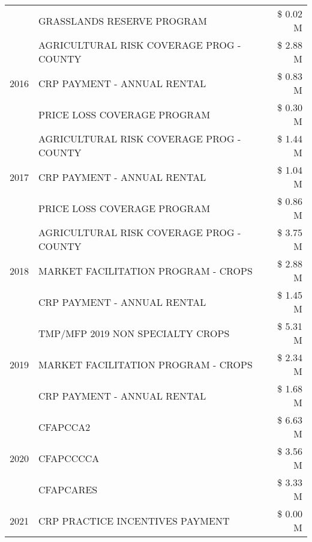 \begin{tabular}{llr}
 & GRASSLANDS RESERVE PROGRAM & \$ 0.02 M \\
\cline{1-3}
\multirow[t]{3}{*}{2016} & AGRICULTURAL RISK COVERAGE PROG - COUNTY & \$ 2.88 M \\
 & CRP PAYMENT - ANNUAL RENTAL & \$ 0.83 M \\
 & PRICE LOSS COVERAGE PROGRAM & \$ 0.30 M \\
\cline{1-3}
\multirow[t]{3}{*}{2017} & AGRICULTURAL RISK COVERAGE PROG - COUNTY & \$ 1.44 M \\
 & CRP PAYMENT - ANNUAL RENTAL & \$ 1.04 M \\
 & PRICE LOSS COVERAGE PROGRAM & \$ 0.86 M \\
\cline{1-3}
\multirow[t]{3}{*}{2018} & AGRICULTURAL RISK COVERAGE PROG - COUNTY & \$ 3.75 M \\
 & MARKET FACILITATION PROGRAM - CROPS & \$ 2.88 M \\
 & CRP PAYMENT - ANNUAL RENTAL & \$ 1.45 M \\
\cline{1-3}
\multirow[t]{3}{*}{2019} & TMP/MFP 2019 NON SPECIALTY CROPS & \$ 5.31 M \\
 & MARKET FACILITATION PROGRAM - CROPS & \$ 2.34 M \\
 & CRP PAYMENT - ANNUAL RENTAL & \$ 1.68 M \\
\cline{1-3}
\multirow[t]{3}{*}{2020} & CFAPCCA2 & \$ 6.63 M \\
 & CFAPCCCCA & \$ 3.56 M \\
 & CFAPCARES & \$ 3.33 M \\
\cline{1-3}
2021 & CRP PRACTICE INCENTIVES PAYMENT & \$ 0.00 M \\
\cline{1-3}
\bottomrule
\end{tabular}
